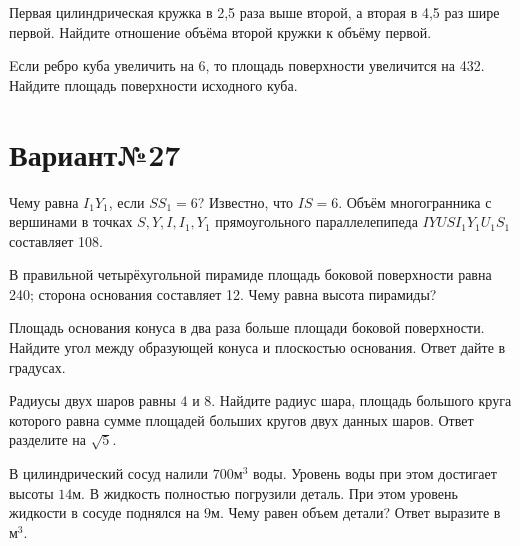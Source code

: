\documentclass[4apaper]{article}
\begin{document}
\begin{taskBN}{5}
 Первая цилиндрическая кружка в 2,5 раза выше второй, а вторая в 4,5 раз шире первой. Найдите отношение объёма второй кружки к объёму первой.
\end{taskBN}

\begin{taskBN}{6}
Eсли ребро куба увеличить на 6, то площадь поверхности увеличится на 432. Найдите площадь поверхности исходного куба.
\end{taskBN}
\newpage\section*{Вариант№27}

\begin{taskBN}{1}
Чему равна  $I_1Y_1$, если $SS_1=6$? Известно, что  $IS=6$. Объём многогранника с вершинами в точках $S,Y,I,I_1,Y_1$ прямоугольного параллелепипеда $IYUSI_1Y_1U_1S_1$ составляет 108. 
\end{taskBN}

\begin{taskBN}{2}
В правильной четырёхугольной пирамиде площадь боковой поверхности равна 240; сторона основания составляет 12. Чему равна высота пирамиды?
\end{taskBN}

\begin{taskBN}{3}
Площадь основания конуса в два раза больше площади боковой поверхности. Найдите угол между образующей конуса и плоскостью основания. Ответ дайте в градусах.
\end{taskBN}

\begin{taskBN}{4}
Радиусы двух шаров равны $4$ и $8$. Найдите радиус шара, площадь большого круга которого равна сумме площадей больших кругов двух данных шаров. Ответ разделите на $\sqrt{5}$.
\end{taskBN}

\begin{taskBN}{5}
В цилиндрический сосуд налили $700\mbox{м}^3$ воды. Уровень воды при этом достигает высоты $14$м. В жидкость полностью погрузили деталь. При этом уровень жидкости в сосуде поднялся на $9$м. Чему равен объем детали? Ответ выразите в $\mbox{м}^3$.
\end{taskBN}
\end{document}
